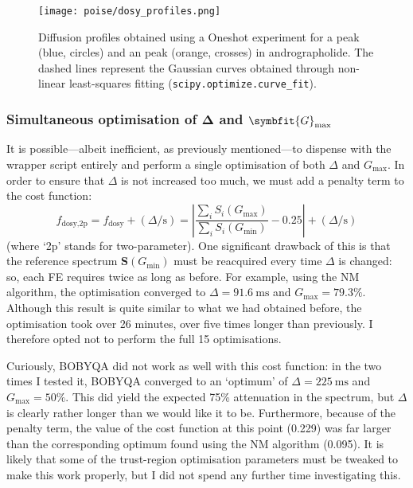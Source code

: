 \begin{figure}[htb]
    \centering
    \texttt{[image: poise/dosy\_profiles.png]}%
    \caption[Diffusion profiles of  and  peaks after optimisation of DOSY parameters]{
        Diffusion profiles obtained using a Oneshot experiment for a  peak (blue, circles) and an  peak (orange, crosses) in andrographolide.
        The dashed lines represent the Gaussian curves obtained through non-linear least-squares fitting (\texttt{scipy.optimize.curve\_fit}).
    }
    \label{fig:poise_diffusion_profiles}
\end{figure}




\subsubsection{Simultaneous optimisation of $\symbf{\Delta}$ and $\symbfit{G}_\text{max}$}

It is possible---albeit inefficient, as previously mentioned---to dispense with the wrapper script entirely and perform a single optimisation of both $\Delta$ and $G_\text{max}$.
In order to ensure that $\Delta$ is not increased too much, we must add a penalty term to the cost function:
\begin{equation}
    \label{eq:dosy_2p_cf}
    f_\text{dosy,2p} = f_\text{dosy} + (\Delta / \unit{\s}) = \left| \frac{\sum_i S_i(G_\text{max})}{\sum_i S_i(G_\text{min})} - 0.25 \right| + (\Delta / \unit{\s})
\end{equation}
(where `2p' stands for two-parameter).
One significant drawback of this is that the reference spectrum $\symbf{S}(G_\text{min})$ must be reacquired every time $\Delta$ is changed: so, each FE requires twice as long as before.
For example, using the NM algorithm, the optimisation converged to $\Delta = \qty{91.6}{\ms}$ and $G_\text{max} = 79.3\%$.
Although this result is quite similar to what we had obtained before, the optimisation took over 26 minutes, over five times longer than previously.
I therefore opted not to perform the full 15 optimisations.

Curiously, BOBYQA did not work as well with this cost function: in the two times I tested it, BOBYQA converged to an `optimum' of $\Delta = \qty{225}{\ms}$ and $G_\text{max} = 50\%$.
This did yield the expected 75\% attenuation in the spectrum, but $\Delta$ is clearly rather longer than we would like it to be.
Furthermore, because of the penalty term, the value of the cost function at this point (0.229) was far larger than the corresponding optimum found using the NM algorithm (0.095).
It is likely that some of the trust-region optimisation parameters must be tweaked to make this work properly, but I did not spend any further time investigating this.
